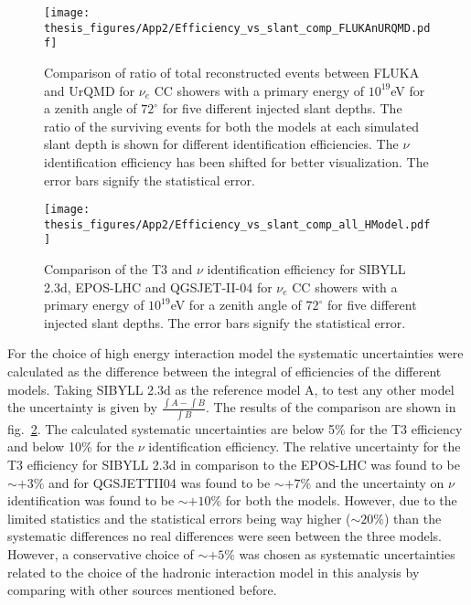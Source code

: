 \begin{figure}[t!]
  \centering
  \texttt{[image: thesis\_figures/App2/Efficiency\_vs\_slant\_comp\_FLUKAnURQMD.pdf]}
  \caption{Comparison of ratio of total reconstructed events between FLUKA and UrQMD for $\nu_e$ CC showers with a primary energy of $10^{19}$eV for a zenith angle of $72^\circ$ for five different injected slant depths. The ratio of the surviving events for both the models at each simulated slant depth is shown for different identification efficiencies. The $\nu$ identification efficiency has been shifted for better visualization. The error bars signify the statistical error.}
  \label{fig:Efficiency_vs_slant_comp_FLUKAnURQMD}
\end{figure}

\begin{figure}[h!]
  \centering
  \texttt{[image: thesis\_figures/App2/Efficiency\_vs\_slant\_comp\_all\_HModel.pdf]}
  \caption{Comparison of the T3 and $\nu$ identification efficiency for SIBYLL 2.3d, EPOS-LHC and QGSJET-II-04 for $\nu_e$ CC showers with a primary energy of $10^{19}$eV for a zenith angle of $72^\circ$ for five different injected slant depths. The error bars signify the statistical error.}
  \label{fig:Eff_vs_slant_comp_all_HModels}
\end{figure}


For the choice of high energy interaction model the systematic uncertainties were calculated as the difference between the integral of efficiencies of the different models. Taking SIBYLL 2.3d as the reference model A, to test any other model the uncertainty is given by $\frac{\int A - \int B}{\int B}$. The results of the comparison are shown in fig.~\ref{fig:Eff_vs_slant_comp_all_HModels}. The calculated systematic uncertainties are below 5\% for the T3 efficiency and below 10\% for the $\nu$ identification efficiency. The relative uncertainty for the T3 efficiency for SIBYLL 2.3d in comparison to the EPOS-LHC was found to be $\sim +3\%$ and for QGSJETTII04 was found to be $\sim + 7\%$ and the uncertainty on $\nu$ identification was found to be $\sim +10\%$ for both the models. However, due to the limited statistics and the statistical errors being way higher ($\sim 20\%$) than the systematic differences no real differences were seen between the three models. However, a conservative choice of $\sim +5\%$ was chosen as systematic uncertainties related to the choice of the hadronic interaction model in this analysis by comparing with other sources mentioned before.  



